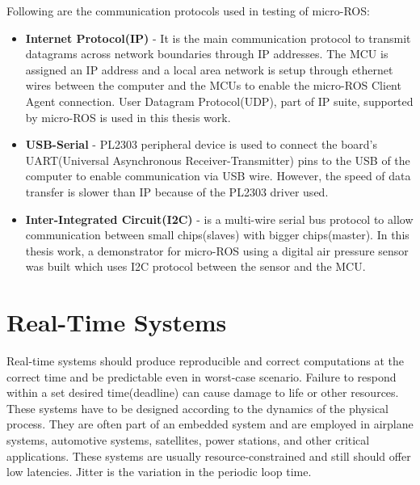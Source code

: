 \documentclass[%
xelatex,
	oneside,		%
	12pt,			%
	parskip=half,	%
	abstracton,
	chapterprefix=true%
    appendixprefix=true]
{scrbook}
\begin{document}
	
\vspace*{0.5cm}
Following are the communication protocols used in testing of micro-ROS:
\begin{itemize}
\item {\bfseries Internet Protocol(IP)} - It is the main communication protocol to transmit datagrams across network boundaries through IP addresses. The MCU is assigned an IP address and a local area network is setup through ethernet wires between the computer and the MCUs to enable the micro-ROS Client Agent connection. User Datagram Protocol(UDP), part of IP suite, supported by micro-ROS is used in this thesis work.
\item {\bfseries USB-Serial} - PL2303 peripheral device is used to connect the board’s UART(Universal Asynchronous Receiver-Transmitter) pins to the USB of the computer to enable communication via USB wire. However, the speed of data transfer is slower than IP because of the PL2303 driver used.
\item {\bfseries Inter-Integrated Circuit(I2C)} - is a multi-wire serial bus protocol to allow communication between small chips(slaves) with bigger chips(master). In this thesis work, a demonstrator for micro-ROS using a digital air pressure sensor was built which uses I2C protocol between the sensor and the MCU.
\end{itemize}

	
	\section{Real-Time Systems}
	
	
	\vspace*{0.5cm}	
Real-time systems should produce reproducible and correct computations at the correct time and be predictable even in worst-case scenario. Failure to respond within a set desired time(deadline) can cause damage to life or other resources. These systems have to be designed according to the dynamics of the physical process. They are often part of an embedded system and are employed in airplane systems, automotive systems, satellites, power stations, and other critical applications. These systems are usually resource-constrained and still should offer low latencies. Jitter is the variation in the periodic loop time.
	
\end{document}
